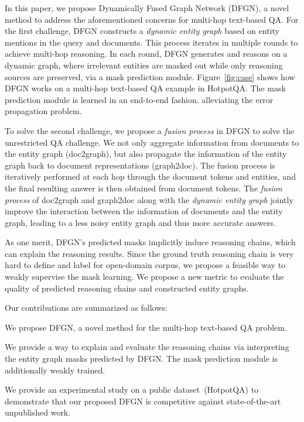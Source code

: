 \documentclass[11pt,a4paper]{article}
\newcommand{\hotpotqa}{HotpotQA\xspace}
\newcommand{\method}{DFGN\xspace}
\begin{document}
In this paper, we propose Dynamically Fused Graph Network (\method), a novel method to address the aforementioned concerns for multi-hop text-based QA.
For the first challenge, \method constructs a \emph{dynamic entity graph} based on entity mentions in the query and documents. 
This process iterates in multiple rounds to achieve multi-hop reasoning. 
In each round, \method generates and reasons on a dynamic graph, where irrelevant entities are masked out while only reasoning sources are preserved, via a mask prediction module. 
Figure~\ref{fig:case} shows how DFGN works on a multi-hop text-based QA example in HotpotQA.
The mask prediction module is learned in an end-to-end fashion, alleviating the error propagation problem.

To solve the second challenge, we propose a \emph{fusion process} in \method to solve the unrestricted QA challenge.
We not only aggregate information from documents to the entity graph (doc2graph), but also propagate the information of the entity graph back to document representations (graph2doc).
The fusion process is iteratively performed at each hop through the document tokens and entities, and the final resulting answer is then obtained from document tokens.
The \emph{fusion process} of doc2graph and graph2doc along with the \emph{dynamic entity graph} jointly improve the interaction between the information of documents and the entity graph, leading to a less noisy entity graph and thus more accurate answers.

As one merit, \method's predicted masks implicitly induce reasoning chains, which can explain the reasoning results. 
Since the ground truth reasoning chain is very hard to define and label for open-domain corpus, we propose a feasible way to weakly supervise the mask learning. 
We propose a new metric to evaluate the quality of predicted reasoning chains and constructed entity graphs.

Our contributions are summarized as follows:
\begin{itemize*}
    \item We propose \method, a novel method for the multi-hop text-based QA problem.
\item We provide a way to explain and evaluate the reasoning chains via interpreting the entity graph masks predicted by \method. The mask prediction module is additionally weakly trained.
    \item We provide an experimental study on a public dataset~(\hotpotqa) to demonstrate that our proposed \method is competitive against state-of-the-art unpublished work. 
\end{itemize*} 
\end{document}

